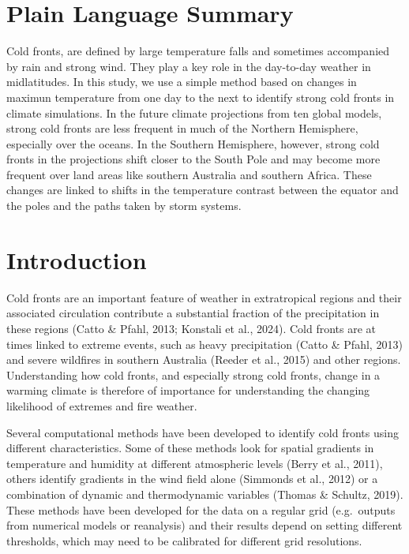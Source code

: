 \documentclass[
]{agujournal2019}
\begin{document}
\section*{Plain Language Summary}
Cold fronts, are defined by large temperature falls and sometimes
accompanied by rain and strong wind. They play a key role in the
day-to-day weather in midlatitudes. In this study, we use a simple
method based on changes in maximun temperature from one day to the next
to identify strong cold fronts in climate simulations. In the future
climate projections from ten global models, strong cold fronts are less
frequent in much of the Northern Hemisphere, especially over the oceans.
In the Southern Hemisphere, however, strong cold fronts in the
projections shift closer to the South Pole and may become more frequent
over land areas like southern Australia and southern Africa. These
changes are linked to shifts in the temperature contrast between the
equator and the poles and the paths taken by storm systems.




\section{Introduction}\label{introduction}

Cold fronts are an important feature of weather in extratropical regions
and their associated circulation contribute a substantial fraction of
the precipitation in these regions (Catto \& Pfahl, 2013; Konstali et
al., 2024). Cold fronts are at times linked to extreme events, such as
heavy precipitation (Catto \& Pfahl, 2013) and severe wildfires in
southern Australia (Reeder et al., 2015) and other regions.
Understanding how cold fronts, and especially strong cold fronts, change
in a warming climate is therefore of importance for understanding the
changing likelihood of extremes and fire weather.

Several computational methods have been developed to identify cold
fronts using different characteristics. Some of these methods look for
spatial gradients in temperature and humidity at different atmospheric
levels (Berry et al., 2011), others identify gradients in the wind field
alone (Simmonds et al., 2012) or a combination of dynamic and
thermodynamic variables (Thomas \& Schultz, 2019). These methods have
been developed for the data on a regular grid (e.g.~outputs from
numerical models or reanalysis) and their results depend on setting
different thresholds, which may need to be calibrated for different grid
resolutions.
\end{document}
